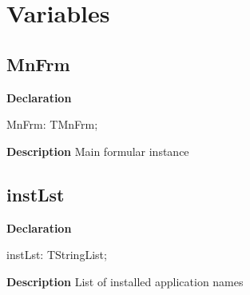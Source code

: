 \documentclass{report}
\newif\ifpdf
\begin{document}
\section{Variables}
\ifpdf
\subsection*{\large{\textbf{MnFrm}}\normalsize\hspace{1ex}\hrulefill}
\else
\subsection*{MnFrm}
\fi
\label{manager-MnFrm}
\begin{list}{}{
\setlength{\itemindent}{0cm}
\setlength{\listparindent}{0cm}
\setlength{\leftmargin}{\evensidemargin}
\addtolength{\leftmargin}{\tmplength}
\settowidth{\labelsep}{X}
\addtolength{\leftmargin}{\labelsep}
\setlength{\labelwidth}{\tmplength}
}
\item[\textbf{Declaration}\hfill]
\ifpdf
\begin{flushleft}
\fi
\begin{ttfamily}
MnFrm:   TMnFrm;\end{ttfamily}

\ifpdf
\end{flushleft}
\fi

\par
\item[\textbf{Description}]
Main formular instance

\end{list}
\ifpdf
\subsection*{\large{\textbf{instLst}}\normalsize\hspace{1ex}\hrulefill}
\else
\subsection*{instLst}
\fi
\label{manager-instLst}
\begin{list}{}{
\setlength{\itemindent}{0cm}
\setlength{\listparindent}{0cm}
\setlength{\leftmargin}{\evensidemargin}
\addtolength{\leftmargin}{\tmplength}
\settowidth{\labelsep}{X}
\addtolength{\leftmargin}{\labelsep}
\setlength{\labelwidth}{\tmplength}
}
\item[\textbf{Declaration}\hfill]
\ifpdf
\begin{flushleft}
\fi
\begin{ttfamily}
instLst: TStringList;\end{ttfamily}

\ifpdf
\end{flushleft}
\fi

\par
\item[\textbf{Description}]
List of installed application names

\end{list}
\end{document}
